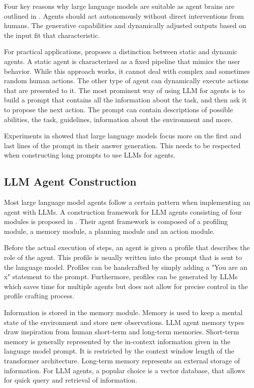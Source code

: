 \documentclass[../main.tex]{subfiles}
\begin{document}
Four key reasons why large language models are suitable as agent brains are outlined in \cite{Xi2023}.
Agents should act autonomously without direct interventions from humans.
The generative capabilities and dynamically adjusted outputs based on the input fit that characteristic.

For practical applications, \autocite{Zhu2024} proposes a distinction between static and dynamic agents.
A static agent is characterized as a fixed pipeline that mimics the user behavior.
While this approach works,
it cannot deal with complex and sometimes random human actions.
The other type of agent can dynamically execute actions that are presented to it.
The most prominent way of using LLM for agents
is to build a prompt that contains all the information about the task,
and then ask it to propose the next action.
The prompt can contain descriptions of possible abilities, the task, guidelines,
information about the environment and more.

Experiments in \cite{Liu2023} showed
that large language models focus more on the first and last lines of the prompt
in their answer generation.
This needs to be respected when constructing long prompts to use LLMs for agents.

\subsection{LLM Agent Construction}

Most large language model agents follow a certain pattern
when implementing an agent with LLMs.
A construction framework for LLM agents consisting of four modules
is proposed in \cite{Wang2023}.
Their agent framework is composed of a profiling module, a memory module,
a planning module and an action module.

Before the actual execution of steps, an agent is given a profile that describes
the role of the agent.
This profile is usually written into the prompt that is sent to the language model.
Profiles can be handcrafted by simply adding a "You are an x" statement to the prompt.
Furthermore, profiles can be generated by LLMs which saves time for multiple agents
but does not allow for precise control in the profile crafting process.

Information is stored in the memory module.
Memory is used to keep a mental state of the environment and store new observations.
LLM agent memory types draw inspiration from human short-term and long-term memories.
Short-term memory is generally represented by the in-context information given in the language model prompt.
It is restricted by the context window length of the transformer architecture.
Long-term memory represents an external storage of information.
For LLM agents, a popular choice is a vector database,
that allows for quick query and retrieval of information.
\end{document}
